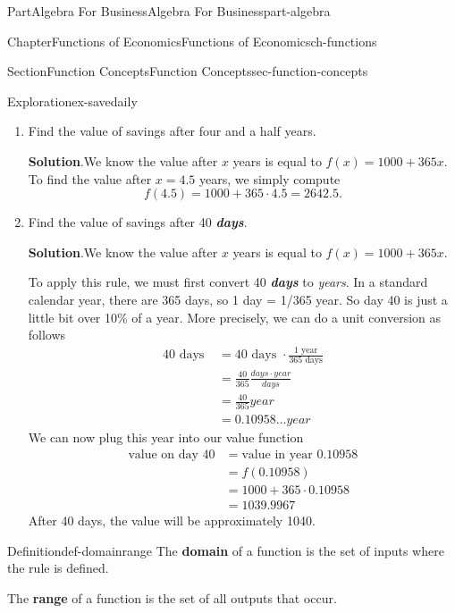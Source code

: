 \documentclass{tufte-book}
\newcommand{\blocktitlefont}{\relax}
\newcommand{\alert}[1]{\textbf{\textit{#1}}}
\newcommand{\terminology}[1]{\textbf{#1}}
\numberwithin{equation}{chapter}
\newcommand{\amp}{&}
\begin{document}
\begin{partptx}{Part}{Algebra For Business}{}{Algebra For Business}{}{}{part-algebra}
\begin{chapterptx}{Chapter}{Functions of Economics}{}{Functions of Economics}{}{}{ch-functions}
\begin{sectionptx}{Section}{Function Concepts}{}{Function Concepts}{}{}{sec-function-concepts}
\begin{exploration}{Exploration}{}{ex-savedaily}
\begin{enumerate}[font=\bfseries,label=(\alph*),ref=\alph*]
\begin{figureptx}{Figure}{}{fig_algebra_domainrange}{}
\begin{image}{0}{1}{0}{}
{\begin{tikzpicture}
\end{tikzpicture}
}%
\end{image}%
\tcblower
\end{figureptx}%
\item{}Find the value of savings after four and a half years.%
\par\smallskip%
\noindent\textbf{\blocktitlefont Solution}.\hypertarget{ex-savedaily-4-2}{}\quad{}We know the value after \(x\) years is equal to \(f(x) = 1000 + 365 x \). To find the value after \(x=4.5\) years, we simply compute%
\begin{equation*}
f(4.5) = 1000 + 365\cdot 4.5 = 2642.5\text{.}
\end{equation*}
%
\item{}Find the value of savings after 40 \alert{days}.%
\par\smallskip%
\noindent\textbf{\blocktitlefont Solution}.\hypertarget{ex-savedaily-5-2}{}\quad{}We know the value after \(x\) years is equal to \(f(x) = 1000 + 365 x \).%
\par
To apply this rule, we must first convert 40 \alert{days} to \emph{years}.  In a standard calendar year, there are 365 days, so 1 day = 1\slash{}365 year.  So day 40 is just a little bit over 10\% of a year.  More precisely, we can do a unit conversion as follows%
\begin{align*}
40\text{ days } \amp = 40 \text{ days }\cdot \frac{1 \text{ year}}{365\text{ days}} \\
\amp = \frac{40}{365} \frac{days\cdot year}{days}\\
\amp = \frac{40}{365} year\\
\amp = 0.10958\dots year
\end{align*}
We can now plug this year into our value function%
\begin{align*}
\text{value on day 40} \amp = \text{value in year }0.10958 \\
\amp = f(0.10958) \\
\amp = 1000 + 365\cdot 0.10958\\
\amp = 1039.9967 
\end{align*}
After 40 days, the value will be approximately \textdollar{}1040.%
\end{enumerate}%
\end{exploration}%
\begin{definition}{Definition}{}{def-domainrange}%
The \terminology{domain} of a function is the set of inputs where the rule is defined.%
\par
The \terminology{range} of a function is the set of all outputs that occur.%

\end{definition}
\end{sectionptx}
\end{chapterptx}
\end{partptx}
\end{document}
